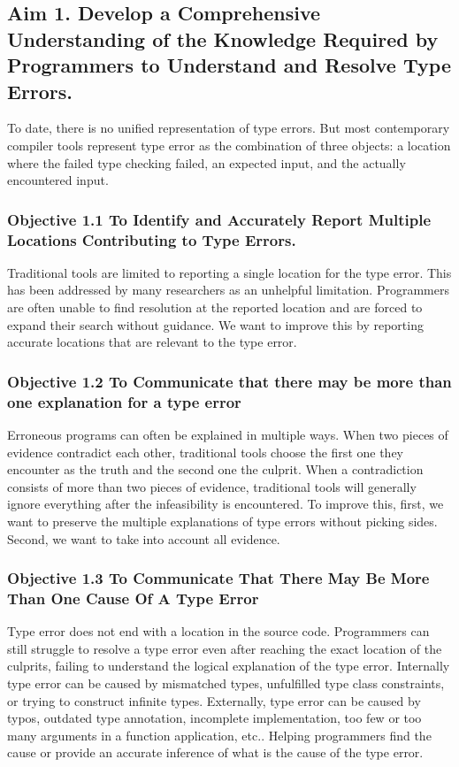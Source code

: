 \subsection{Aim 1. Develop a Comprehensive Understanding of the Knowledge Required by Programmers to Understand and Resolve Type Errors.}

To date, there is no unified representation of type errors. But most contemporary compiler tools represent type error as the combination of three objects: a location where the failed type checking failed, an expected input, and the actually encountered input.

\subsubsection{Objective 1.1 To Identify and Accurately Report Multiple Locations Contributing to Type Errors.}

Traditional tools are limited to reporting a single location for the type error. This has been addressed by many researchers as an unhelpful limitation. Programmers are often unable to find resolution at the reported location and are forced to expand their search without guidance. We want to improve this by reporting accurate locations that are relevant to the type error.

\subsubsection{Objective 1.2 To Communicate that there may be more than one explanation for a type error}

Erroneous programs can often be explained in multiple ways. When two pieces of evidence contradict each other, traditional tools choose the first one they encounter as the truth and the second one the culprit. When a contradiction consists of more than two pieces of evidence, traditional tools will generally ignore everything after the infeasibility is encountered. To improve this, first, we want to preserve the multiple explanations of type errors without picking sides. Second, we want to take into account all evidence.

\subsubsection{Objective 1.3 To Communicate That There May Be More Than One Cause Of A Type Error}

Type error does not end with a location in the source code. Programmers can still struggle to resolve a type error even after reaching the exact location of the culprits, failing to understand the logical explanation of the type error. Internally type error can be caused by mismatched types, unfulfilled type class constraints, or trying to construct infinite types. Externally, type error can be caused by typos, outdated type annotation, incomplete implementation, too few or too many arguments in a function application, etc.. Helping programmers find the cause or provide an accurate inference of what is the cause of the type error.

